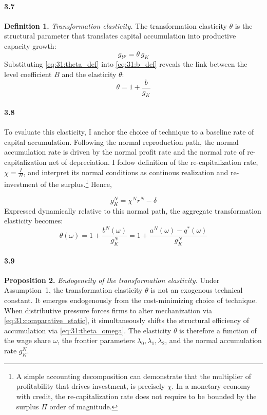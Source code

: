 \paragraph{3.7}
\textbf{Definition 1.} \textit{Transformation elasticity.}
The transformation elasticity $\theta$ is the structural
parameter that translates capital accumulation into productive
capacity growth:
\begin{equation}
	g_{Y^p} = \theta\, g_K
	\label{eq:31:theta_def}
\end{equation}
Substituting \eqref{eq:31:theta_def} into
\eqref{eq:31:b_def} reveals the link between the level
coefficient $B$ and the elasticity $\theta$:
\begin{equation}
	\theta = 1 + \frac{b}{g_K}
	\label{eq:31:theta_link}
\end{equation}

\paragraph{3.8}
To evaluate this elasticity, I anchor the choice of technique
to a baseline rate of capital accumulation. Following the
normal reproduction path, the normal accumulation rate is
driven by the normal profit rate and the normal rate of re-capitalization  net of depreciation. I follow \citet{Foley1986} definition of the re-capitalization rate, $\chi=\frac{I}{\Pi}$, and interpret its normal conditions as continous realization and re-investment of the surplus.\footnote{A simple accounting decomposition can demonstrate that the multiplier of profitability that drives investment, is precisely $\chi$. In a monetary economy with credit, the re-capitalization rate does not require to be bounded by the surplus $\Pi$ order of magnitude.} Hence, 

\begin{equation}
	g_K^N = \chi^N r^N - \delta
	\label{eq:31:gKN}
\end{equation}
Expressed dynamically relative to this normal path, the
aggregate transformation elasticity becomes:
\begin{equation}
	\theta(\omega) = 1 + \frac{b^N(\omega)}{g_K^N}
	= 1 + \frac{a^N(\omega) - q^*(\omega)}{g_K^N}
	\label{eq:31:theta_omega}
\end{equation}

\paragraph{3.9}
\textbf{Proposition 2.} \textit{Endogeneity of the
	transformation elasticity.} Under Assumption~1, the
transformation elasticity $\theta$ is not an exogenous
technical constant. It emerges endogenously from the
cost-minimizing choice of technique. When distributive
pressure forces firms to alter mechanization via
\eqref{eq:31:comparative_static}, it simultaneously shifts
the structural efficiency of accumulation via
\eqref{eq:31:theta_omega}. The elasticity $\theta$ is
therefore a function of the wage share $\omega$, the frontier
parameters $\lambda_0, \lambda_1, \lambda_2$, and the normal
accumulation rate $g_K^N$.



